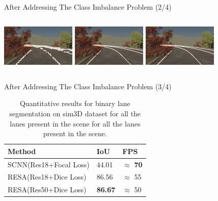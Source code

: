 \documentclass[aspectratio=169]{beamer}
\begin{document}
\begin{frame}{After Addressing The Class Imbalance Problem (2/4)}
\begin{columns}[t]
        \includegraphics[width=\columnwidth,height= 2cm]{images/full_res18_scnn_focal.png}
        \centering
        \includegraphics[width=\columnwidth,height= 2cm]{images/Resa_r18_full_dice.png}
        \includegraphics[width=\columnwidth,height= 2cm]{images/Resa_r50_full_dice.png}
        \centering
    \end{columns}

\end{frame}

\begin{frame}{After Addressing The Class Imbalance Problem (3/4)}
 \begin{table}[h]
    \caption{Quantitative results for binary lane segmentation on sim3D dataset for all the lanes present in the scene for all the lanes present in the scene.}
    \centering
    \begin{tabular}{|l|l|l|}
    \hline
        \textbf{Method} & \textbf{IoU} & \textbf{FPS} \\ \hline
        SCNN(Res18+Focal Loss)& 44.01 & $\approx$ \textbf{70} \\\hline
        RESA(Res18+Dice Loss) & 86.56 & $\approx$ 55 \\\hline
        RESA(Res50+Dice Loss) & \textbf{86.67} & $\approx$ 50 \\\hline
    \end{tabular}
\end{table}
    
\end{frame}
\end{document}
